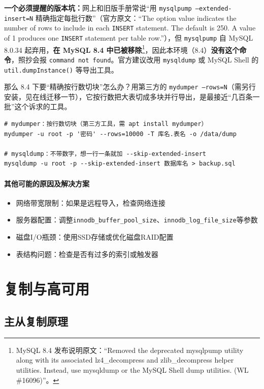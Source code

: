 \documentclass[12pt,UTF8]{ctexbook}
\begin{document}
\textbf{一个必须提醒的版本坑：}网上和旧版手册常说“用 \texttt{mysqlpump --extended-insert=N} 精确指定每批行数”（官方原文：“The option value indicates the number of rows to include in each \texttt{INSERT} statement. The default is 250. A value of 1 produces one \texttt{INSERT} statement per table row.”），但 \texttt{mysqlpump} 自 MySQL 8.0.34 起弃用，\textbf{在 MySQL 8.4 中已被移除}\footnote{MySQL 8.4 发布说明原文：“Removed the deprecated mysqlpump utility along with its associated lz4\_decompress and zlib\_decompress helper utilities. Instead, use mysqldump or the MySQL Shell dump utilities. (WL \#16096)”。}，因此本环境（8.4）\textbf{没有这个命令}，照抄会报 \texttt{command not found}。官方建议改用 \texttt{mysqldump} 或 MySQL Shell 的 \texttt{util.dumpInstance()} 等导出工具。

那么 8.4 下要“精确按行数切块”怎么办？用第三方的 \texttt{mydumper --rows=N}（需另行安装，见在线迁移一节），它按行数把大表切成多块并行导出，是最接近“几百条一批”这个诉求的工具。

\begin{lstlisting}
# mydumper：按行数切块（第三方工具，需 apt install mydumper）
mydumper -u root -p '密码' --rows=10000 -T 库名.表名 -o /data/dump

# mysqldump：不带数字，想一行一条就加 --skip-extended-insert
mysqldump -u root -p --skip-extended-insert 数据库名 > backup.sql
\end{lstlisting}

\subsubsection{其他可能的原因及解决方案}

\begin{itemize}[leftmargin=2cm]
	\item 网络带宽限制：如果是远程导入，检查网络连接
	\item 服务器配置：调整\verb|innodb_buffer_pool_size|、\verb|innodb_log_file_size|等参数
	\item 磁盘I/O瓶颈：使用SSD存储或优化磁盘RAID配置
	\item 表结构问题：检查是否有过多的索引或触发器
\end{itemize}

\chapter{复制与高可用}
\label{ch:replication}

\section{主从复制原理}
\end{document}
